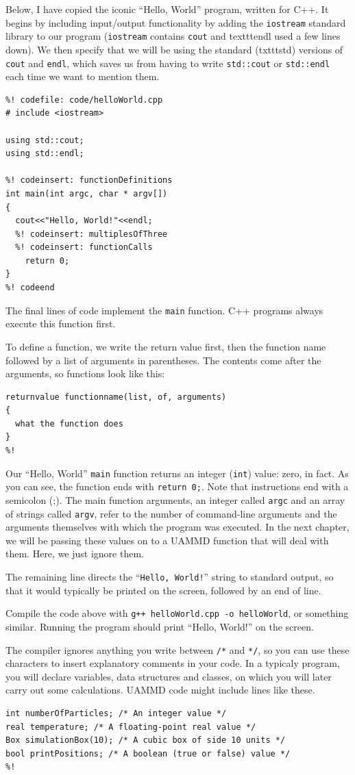 Below, I have copied the iconic ``Hello, World'' program, written for C++. It
begins by including input/output functionality by adding the \texttt{iostream}
standard library to our program (\texttt{iostream} contains \texttt{cout} and
texttt{endl} used a few lines down). We then specify that we will be using
the standard (txttt{std}) versions of \texttt{cout} and \texttt{endl}, which
saves us from having to write \texttt{std::cout} or \texttt{std::endl} each
time we want to mention them.
\begin{lstlisting}
%! codefile: code/helloWorld.cpp
# include <iostream>

using std::cout;
using std::endl;

%! codeinsert: functionDefinitions
int main(int argc, char * argv[])
{
  cout<<"Hello, World!"<<endl;
  %! codeinsert: multiplesOfThree
  %! codeinsert: functionCalls
	return 0;
}
%! codeend
\end{lstlisting}

The final lines of code implement the \texttt{main} function. C++ programs
always execute this function first.

To define a function, we write the return value first, then the function name
followed by a list of arguments in parentheses. The contents come after the
arguments, so functions look like this:
\begin{lstlisting}
returnvalue functionname(list, of, arguments)
{
  what the function does
}
%!
\end{lstlisting}

Our ``Hello, World'' \texttt{main} function returns an integer (\texttt{int})
value: zero, in fact. As you can see, the function ends with \texttt{return 0;}.
Note that instructions end with a semicolon (;). The main function arguments, an
integer called \texttt{argc} and an array of strings called \texttt{argv}, refer
to the number of command-line arguments and the arguments themselves with which
the program was executed. In the next chapter, we will be passing these values
on to a UAMMD function that will deal with them. Here, we just ignore them.

The remaining line directs the ``\texttt{Hello, World!}'' string to standard
output, so that it would typically be printed on the screen, followed by an
end of line.

Compile the code above with \texttt{g++ helloWorld.cpp -o helloWorld}, or
something similar. Running the program should print ``Hello, World!'' on the
screen.

The compiler ignores anything you write between \texttt{/*} and \texttt{*/}, so
you can use these characters to insert explanatory comments in your code. In a
typicaly program, you will declare variables, data structures and classes, on
which you will later carry out some calculations. UAMMD code might include lines
like these.
\begin{lstlisting}
int numberOfParticles; /* An integer value */
real temperature; /* A floating-point real value */
Box simulationBox(10); /* A cubic box of side 10 units */
bool printPositions; /* A boolean (true or false) value */
%!
\end{lstlisting}

